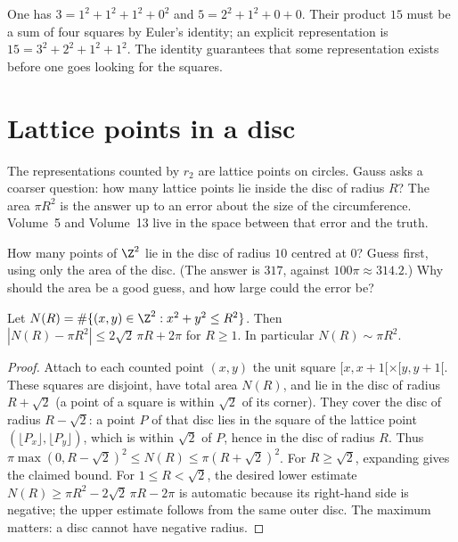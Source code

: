 \begin{examplex}
One has $3=1^2+1^2+1^2+0^2$ and $5=2^2+1^2+0+0$. Their product $15$ must be a sum of four squares by Euler's identity; an explicit representation is $15=3^2+2^2+1^2+1^2$. The identity guarantees that some representation exists before one goes looking for the squares.
\end{examplex}

\section{Lattice points in a disc}

The representations counted by $r_2$ are lattice points on circles. Gauss asks a coarser question: how many lattice points lie inside the disc of radius $R$? The area $\pi R^2$ is the answer up to an error about the size of the circumference. Volume~5 and Volume~13 live in the space between that error and the truth.

\begin{think}
How many points of $\Z^2$ lie in the disc of radius $10$ centred at $0$? Guess first, using only the area of the disc. (The answer is $317$, against $100\pi\approx314.2$.) Why should the area be a good guess, and how large could the error be?
\end{think}

\begin{theorem}[Gauss]\label{thm:circle}
Let $N(R)=\#\{(x,y)\in\Z^2:x^2+y^2\le R^2\}$. Then $\left|N(R)-\pi R^2\right|\le2\sqrt2\,\pi R+2\pi$ for $R\ge1$. In particular $N(R)\sim\pi R^2$.
\end{theorem}
\begin{proof}
Attach to each counted point $(x,y)$ the unit square $[x,x+1[\times[y,y+1[$. These squares are disjoint, have total area $N(R)$, and lie in the disc of radius $R+\sqrt2$ (a point of a square is within $\sqrt2$ of its corner). They cover the disc of radius $R-\sqrt2$: a point $P$ of that disc lies in the square of the lattice point $(\lfloor P_x\rfloor,\lfloor P_y\rfloor)$, which is within $\sqrt2$ of $P$, hence in the disc of radius $R$. Thus $\pi\max(0,R-\sqrt2)^2\le N(R)\le\pi(R+\sqrt2)^2$. For $R\ge\sqrt2$, expanding gives the claimed bound. For $1\le R<\sqrt2$, the desired lower estimate $N(R)\ge\pi R^2-2\sqrt2\,\pi R-2\pi$ is automatic because its right-hand side is negative; the upper estimate follows from the same outer disc. The maximum matters: a disc cannot have negative radius.
\end{proof}

